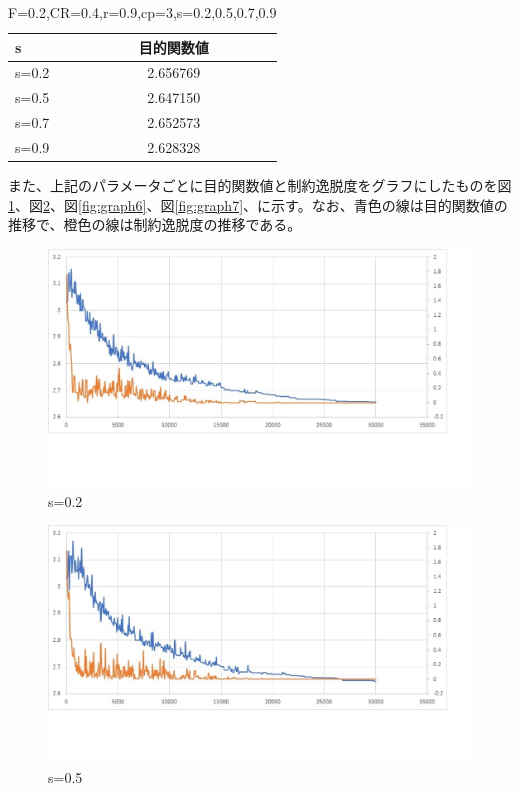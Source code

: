 \documentclass[twocolumn,10pt]{jarticle}
\begin{document}
\begin{table}[htbp]
\begin{center}
\caption{F=0.2,CR=0.4,r=0.9,cp=3,s={0.2,0.5,0.7,0.9}}
\label{tbl:MLP1}
\begin{tabular}{|l|c|c|}
\hline
s     & 目的関数値  \\ \hline
s=0.2 & 2.656769\\ \hline
s=0.5 & 2.647150\\ \hline
s=0.7 & 2.652573\\ \hline
s=0.9 & 2.628328\\ \hline
\end{tabular}
\end{center}
\end{table}
また、上記のパラメータごとに目的関数値と制約逸脱度をグラフにしたものを図\ref{fig:graph4}、図\ref{fig:graph5}、図\ref{fig:graph6}、図\ref{fig:graph7}、に示す。なお、青色の線は目的関数値の推移で、橙色の線は制約逸脱度の推移である。
\begin{figure}[htbp]
  \centering
  \includegraphics[width=.9\linewidth]{fig/s=0.2.eps}
  \caption{s=0.2}
\label{fig:graph4}
\end{figure}
\begin{figure}[htbp]
  \centering
  \includegraphics[width=.9\linewidth]{fig/s=0.5.eps}
  \caption{s=0.5}
\label{fig:graph5}
\end{figure}
\end{document}
